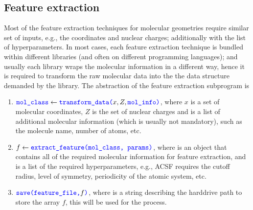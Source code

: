\documentclass[12pt]{article}
\begin{document}
\subsection{Feature extraction}
\label{sub:fe}
Most of the feature extraction techniques for molecular geometries require similar set of inputs, e.g., the coordinates and nuclear charges; additionally with the list of hyperparameters. In most cases, each feature extraction technique is bundled within different libraries (and often on different programming languages); and usually each library wraps the molecular information in a different way, hence it is required to transform the raw molecular data into the the data structure demanded by the library. The abstraction of the feature extraction subprogram is
\begin{enumerate}
	\item $\codeword{mol_class} \leftarrow \codeword{transform_data(}x, Z, \codeword{mol_info)}$, where $x$ is a set of molecular coordinates, $Z$ is the set of nuclear charges and  is a list of additional molecular information (which is usually not mandatory), such as the molecule name, number of atoms, etc.
	\item $f \leftarrow \codeword{extract_feature(mol_class, params)}$, where  is an object that contains all of the required molecular information for feature extraction, and  is a list of the required hyperparameters, e.g., ACSF requires the cutoff radius, level of symmetry, periodicity of the atomic system, etc.
	\item $\codeword{save(feature_file,} f\codeword{)}$, where  is a string describing the harddrive path to store the array $f$, this will be used for the  process.
\end{enumerate}
\end{document}

